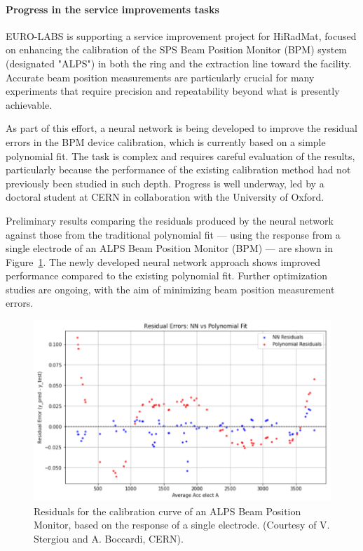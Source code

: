 \paragraph{Progress in the service improvements tasks}

EURO-LABS is supporting a service improvement project for HiRadMat, focused on enhancing the calibration of the SPS Beam Position Monitor (BPM) system (designated "ALPS") in both the ring and the extraction line toward the facility. Accurate beam position measurements are particularly crucial for many experiments that require precision and repeatability beyond what is presently achievable.

As part of this effort, a neural network is being developed to improve the residual errors in the BPM device calibration, which is currently based on a simple polynomial fit. The task is complex and requires careful evaluation of the results, particularly because the performance of the existing calibration method had not previously been studied in such depth. Progress is well underway, led by a doctoral student at CERN in collaboration with the University of Oxford.

Preliminary results comparing the residuals produced by the neural network against those from the traditional polynomial fit — using the response from a single electrode of an ALPS Beam Position Monitor (BPM) — are shown in Figure~\ref{fig:wp3-hrm-si}. The newly developed neural network approach shows improved performance compared to the existing polynomial fit. Further optimization studies are ongoing, with the aim of minimizing beam position measurement errors.

\begin{figure}[!h]
    \centering
    \includegraphics[width=0.75\linewidth]{graphics/hiradmat_SI.png}
    \caption{Residuals for the calibration curve of an ALPS Beam Position Monitor, based on the response of a single electrode.  (Courtesy of V. Stergiou and A. Boccardi, CERN).}
    \label{fig:wp3-hrm-si}
\end{figure}

